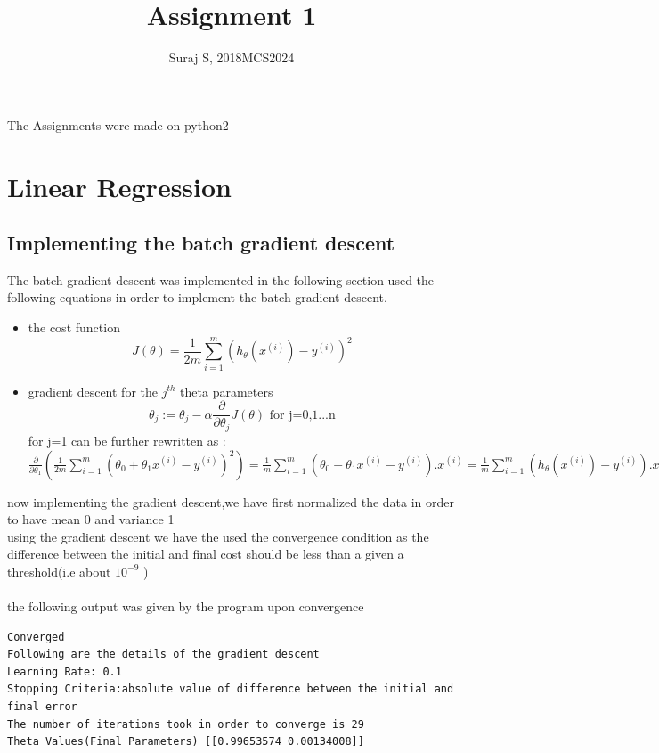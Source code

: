 \documentclass[10pt]{article}
\title{Assignment 1}
\author {Suraj S, 2018MCS2024}
\begin{document}
\maketitle

The Assignments were made on python2 

\section{Linear Regression}
\subsection{Implementing the batch gradient descent}
The batch gradient descent was implemented in the following section used the following equations in order to implement the batch gradient descent.
\\

\begin{itemize}
\item the cost function
$$\displaystyle J(\theta)= \frac{1}{2m}\sum_{i=1}^{m} \left(h_{\theta}(x^{(i)})-y^{(i)}\right)^2$$
\item gradient descent for the $j^{th}$ theta parameters 
$$\displaystyle \theta_j:=\theta_j-\alpha\frac{\partial}{\partial\theta_j}J(\theta)\mbox{ for j=0,1...n}$$
for j=1 can be further rewritten as :$\displaystyle \frac{\partial}{\partial\theta_1}\left(\frac{1}{2m}\sum_{i=1}^{m} \left(\theta_0+\theta_1x^{(i)}-y^{(i)}\right)^2 \right) = \frac{1}{m}\sum_{i=1}^{m} \left(\theta_0+\theta_1x^{(i)}-y^{(i)}\right).x^{(i)} = \frac{1}{m}\sum_{i=1}^{m} \left(h_{\theta}(x^{(i)})-y^{(i)}\right).x^{(i)}$
\end{itemize}
now implementing the gradient descent,we have first normalized the data in order to have mean 0 and variance 1 
\\
using the gradient descent we have the used the convergence condition as the difference between the initial and final cost should be less than a given a threshold(i.e about $10^{-9}$ )
\\
\\
the following output was given by the program upon convergence

\begin{lstlisting}
Converged
Following are the details of the gradient descent
Learning Rate: 0.1
Stopping Criteria:absolute value of difference between the initial and final error
The number of iterations took in order to converge is 29
Theta Values(Final Parameters) [[0.99653574 0.00134008]]
\end{lstlisting}
\newpage
\end{document}

